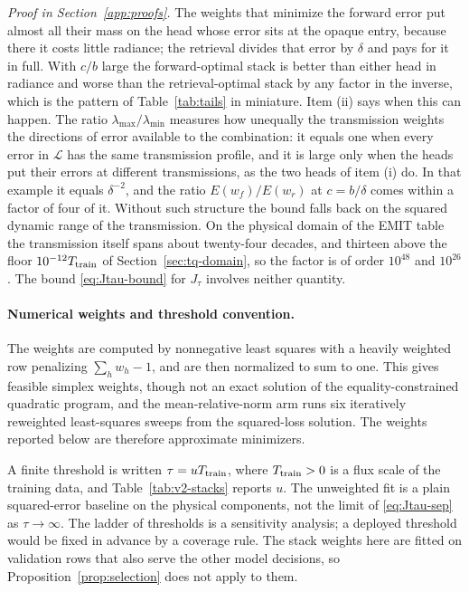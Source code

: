 \noindent\emph{Proof in Section~\ref{app:proofs}.}
The weights that minimize the forward error put almost all their mass on the head whose error
sits at the opaque entry, because there it costs little radiance; the retrieval divides that
error by $\delta$ and pays for it in full. With $c/b$ large the forward-optimal stack is better
than either head in radiance and worse than the retrieval-optimal stack by any factor in the
inverse, which is the pattern of Table~\ref{tab:tails} in miniature. Item (ii) says when this can
happen. The ratio $\lambda_{\max}/\lambda_{\min}$ measures how unequally the transmission weights
the directions of error available to the combination: it equals one when every error in
$\mathcal L$ has the same transmission profile, and it is large only when the heads put their
errors at different transmissions, as the two heads of item (i) do. In that example it equals
$\delta^{-2}$, and the ratio $E(w_f)/E(w_r)$ at $c=b/\delta$ comes within a factor of four of it.
Without such structure the bound falls back on the squared dynamic range of the transmission.
On the physical domain of the EMIT table the transmission itself spans about twenty-four decades,
and thirteen above the floor $10^{-12}T_{\rm train}$ of Section~\ref{sec:tq-domain}, so the
factor is of order $10^{48}$ and $10^{26}$. The bound \eqref{eq:Jtau-bound}
for $J_\tau$ involves neither quantity.

\paragraph{Numerical weights and threshold convention.}
The weights are computed by nonnegative least squares with a heavily weighted row penalizing
$\sum_h w_h-1$, and are then normalized to sum to one. This gives feasible
simplex weights, though not an exact solution of the equality-constrained quadratic program,
and the mean-relative-norm arm runs six iteratively reweighted least-squares sweeps from the
squared-loss solution. The weights reported below are therefore approximate minimizers.

A finite threshold is written $\tau=uT_{\rm train}$, where $T_{\rm train}>0$ is a flux scale of
the training data, and Table~\ref{tab:v2-stacks} reports $u$. The unweighted fit is a plain
squared-error baseline on the physical components, not the limit of \eqref{eq:Jtau-sep} as
$\tau\to\infty$. The ladder of thresholds is a sensitivity analysis; a deployed threshold would
be fixed in advance by a coverage rule. The stack weights here are fitted on validation rows
that also serve the other model decisions, so Proposition~\ref{prop:selection} does not apply to
them.
